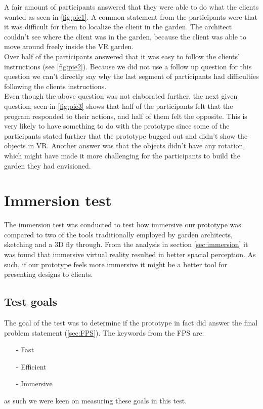 A fair amount of participants answered that they were able to do what the clients wanted as seen in \ref{fig:pie1}. A common statement from the participants were that it was difficult for them to localize the client in the garden. The architect couldn't see where the client was in the garden, because the client was able to move around freely inside the VR garden.\\


Over half of the participants answered that it was easy to follow the clients' instructions (see \autoref{fig:pie2}). Because we did not use a follow up question for this question we can't directly say why the last segment of participants had difficulties following the clients instructions.\\

Even though the above question was not elaborated further, the next given question, seen in \ref{fig:pie3} shows that half of the participants felt that the program responded to their actions, and half of them felt the opposite. This is very likely to have something to do with the prototype since some of the participants stated further that the prototype bugged out and didn't show the objects in VR. Another answer was that the objects didn't have any rotation, which might have made it more challenging for the participants to build the garden they had envisioned.



\section{Immersion test}
The immersion test was conducted to test how immersive our prototype was compared to two of the tools traditionally employed by garden architects, sketching and a 3D fly through. From the analysis in section \ref{sec:immersion} it was found that immersive virtual reality resulted in better spacial perception. As such, if our prototype feels more immersive it might be a better tool for presenting designs to clients.

\subsection{Test goals}
The goal of the test was to determine if the prototype in fact did answer the final problem statement (\autoref{sec:FPS}). The keywords from the FPS are:
\begin{itemize}
	\item[-] Fast
	\item[-] Efficient
	\item[-] Immersive
\end{itemize}
as such we were keen on measuring these goals in this test.
